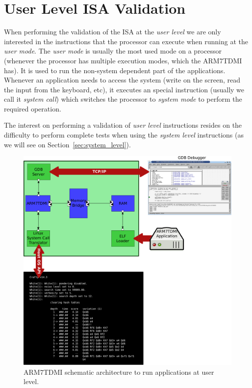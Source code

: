 \section{User Level ISA Validation}
\label{sec:user_level}

When performing the validation of the ISA at the \emph{user level} we are only interested in the instructions that the processor can execute when running at the \emph{user mode}.
The \emph{user mode} is usually the most used mode on a processor (whenever the processor has multiple execution modes, which the ARM7TDMI has).
It is used to run the non-system dependent part of the applications.
Whenever an application needs to access the system (write on the screen, read the input from the keyboard, etc), it executes an special instruction (usually we call it \textit{system call}) which switches the processor to \emph{system mode} to perform the required operation.

The interest on performing a validation of \emph{user level} instructions resides on the difficulty to perform complete tests when using the \emph{system level} instructions (as we will see on Section~\ref{sec:system_level}).

\begin{figure}[!h]
	\begin{center}
		\includegraphics[width=\textwidth]{figures/ARM7TDMI_user_level.pdf}
	\end{center}
	\caption{ARM7TDMI schematic architecture to run applications at user level.}
	\label{fig:arm7tdmi_user_level}
\end{figure}

